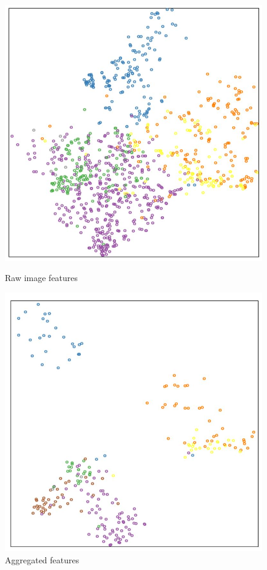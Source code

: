 \documentclass[10pt,twocolumn,letterpaper]{article}
\begin{document}
\begin{figure}
\begin{minipage}[t]{0.25\textwidth}
\centering
\includegraphics[width=\textwidth]{original.JPG}
\caption{Raw image features}
\label{fig:raw}
\end{minipage}%
\begin{minipage}[t]{0.25\textwidth}
\centering
\includegraphics[width=\textwidth]{agg.JPG}
\caption{Aggregated features}
\label{fig:agg}
\end{minipage}
\end{figure}
\end{document}
